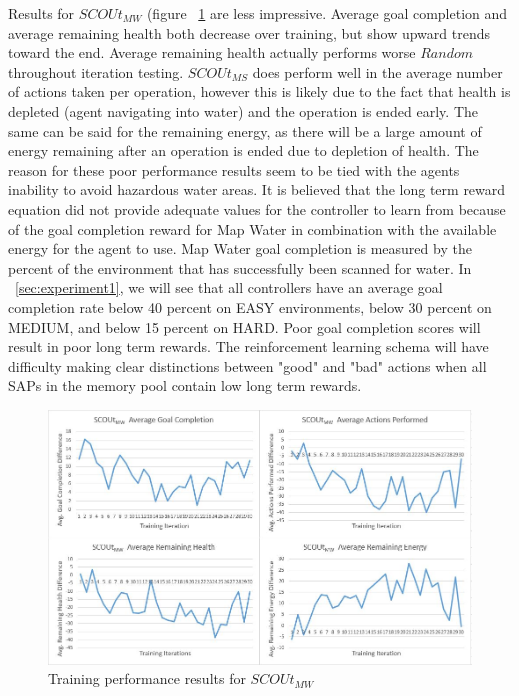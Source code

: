 Results for $SCOUt_{MW}$ (figure ~\ref{fig:mapwater_training_results} are less impressive.
Average goal completion and average remaining health both decrease over training, but show upward trends toward the end.
Average remaining health actually performs worse $Random$ throughout iteration testing.
$SCOUt_{MS}$ does perform well in the average number of actions taken per operation, however this is likely due to the fact that health is depleted (agent navigating into water) and the operation is ended early.
The same can be said for the remaining energy, as there will be a large amount of energy remaining after an operation is ended due to depletion of health.
The reason for these poor performance results seem to be tied with the agents inability to avoid hazardous water areas.
It is believed that the long term reward equation  did not provide adequate values for the controller to learn from because of the goal completion reward for Map Water in combination with the available energy for the agent to use.
Map Water goal completion is measured by the percent of the environment that has successfully been scanned for water.
In ~\ref{sec:experiment1}, we will see that all controllers have an average goal completion rate below 40 percent on EASY environments, below 30 percent on MEDIUM, and below 15 percent on HARD.
Poor goal completion scores will result in poor long term rewards.
The reinforcement learning schema will have difficulty making clear distinctions between "good" and "bad" actions when all SAPs in the memory pool contain low long term rewards.

\begin{figure}[h]
  \includegraphics[width=1.0\columnwidth]{Figures/Results/Training/SCOUt-MapWater.JPG}
  \caption{Training performance results for $SCOUt_{MW}$}
  \label{fig:mapwater_training_results}
\end{figure}

